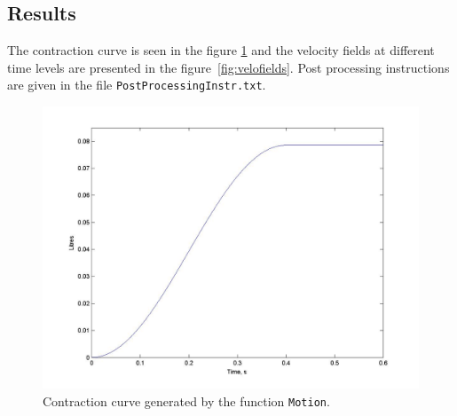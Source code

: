 \subsection*{Results}

The contraction curve  is seen in the figure \ref{fig:contra} and
the velocity fields at different time levels are presented
in the figure~\ref{fig:velofields}.  Post processing instructions
are given in the file {\tt PostProcessingInstr.txt}.

\begin{figure}[!hb]
\begin{center}
\includegraphics[width=15cm]{motion}
\caption{Contraction curve generated by the function {\tt Motion}.}
\label{fig:contra}
\end{center}
\end{figure}

